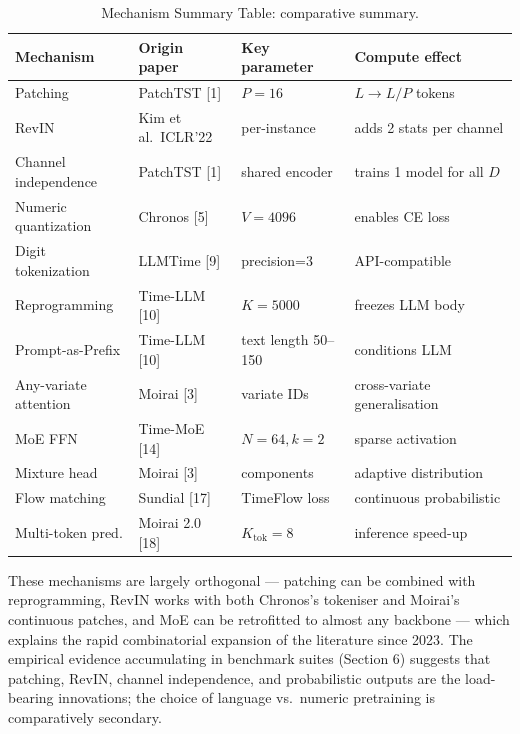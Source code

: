 \documentclass{article}
\begin{document}
\begin{table}[t]
\centering
\caption{Mechanism Summary Table: comparative summary.}
\label{tab:mechanism-summary-table}
\begin{tabular}{>{\raggedright\arraybackslash}p{0.2414\linewidth}
  >{\raggedright\arraybackslash}p{0.2069\linewidth}
  >{\raggedright\arraybackslash}p{0.2299\linewidth}
  >{\raggedright\arraybackslash}p{0.3218\linewidth}}
\toprule
Mechanism & Origin paper & Key parameter & Compute effect \\
\midrule
Patching & PatchTST {[}1{]} & \(P=16\) & \(L \to L/P\) tokens \\
RevIN & Kim et al.~ICLR'22 & per-instance & adds 2 stats per channel \\
Channel independence & PatchTST {[}1{]} & shared encoder & trains 1 model for all \(D\) \\
Numeric quantization & Chronos {[}5{]} & \(V=4096\) & enables CE loss \\
Digit tokenization & LLMTime {[}9{]} & precision=3 & API-compatible \\
Reprogramming & Time-LLM {[}10{]} & \(K=5000\) & freezes LLM body \\
Prompt-as-Prefix & Time-LLM {[}10{]} & text length 50--150 & conditions LLM \\
Any-variate attention & Moirai {[}3{]} & variate IDs & cross-variate generalisation \\
MoE FFN & Time-MoE {[}14{]} & \(N=64, k=2\) & sparse activation \\
Mixture head & Moirai {[}3{]} & 3 components & adaptive distribution \\
Flow matching & Sundial {[}17{]} & TimeFlow loss & continuous probabilistic \\
Multi-token pred. & Moirai 2.0 {[}18{]} & \(K_{\mathrm{tok}}=8\) & inference speed-up \\
\end{tabular}
\end{table}

These mechanisms are largely orthogonal --- patching can be combined with reprogramming, RevIN works with both Chronos's tokeniser and Moirai's continuous patches, and MoE can be retrofitted to almost any backbone --- which explains the rapid combinatorial expansion of the literature since 2023. The empirical evidence accumulating in benchmark suites (Section 6) suggests that patching, RevIN, channel independence, and probabilistic outputs are the load-bearing innovations; the choice of language vs.~numeric pretraining is comparatively secondary.
\end{document}
